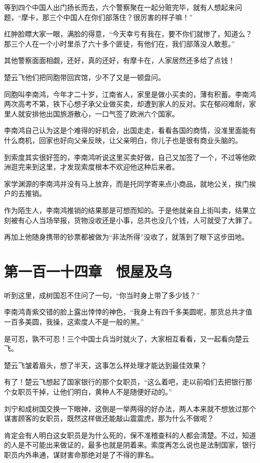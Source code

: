 等到四个中国人出门扬长而去，六个警察聚在一起分赃完毕，就有人想起来问题，“摩卡，那三个中国人在你们部落住？很厉害的样子嘛！”

红肿脸瞟大家一眼，满脸的得意，“今天幸亏有我在，要不你们就惨了，知道么？那三个人在一个小时里杀了六十多个匪徒，有他们在，我们部落没人敢惹。”

其他警察面面相觑，还好，真的还好，有摩卡在，人家居然还多给了点钱！

楚云飞他们把同胞带回宾馆，少不了又是一顿盘问。

同胞叫李南鸿，今年才二十岁，江南省人，家里是做小买卖的，薄有积蓄。李南鸿两次高考不第，铁下心想子承父业做买卖，却遭到家人的反对。实在郁闷难耐，家里人就安排他出国旅游散心，一口气签了欧洲六个国家。

李南鸿自己认为这是个难得的好机会，出国走走，看看各国的商情，没准里面能有什么商机，回家也好向父亲反映，让父亲明白，你儿子也是很有商业头脑的。

到索度其实很好签的，李南鸿听说这里买卖好做，自己又加签了一个，不过等他欧洲逛完来到这里，才发现索度根本不欢迎他这种后来者。

家学渊源的李南鸿并没有马上放弃，而是托同学寄来点小商品，就地公关，挨门挨户的去推销。

作为陌生人，李南鸿推销的结果那是可想而知的。于是他就亲自上街叫卖，结果立刻被有心人当场举报，货物没收还是小事，总共也没几个钱，人可就受了大罪了。

再加上他随身携带的钞票都被做为“非法所得”没收了，就落到了眼下这步田地。

\section{第一百一十四章　恨屋及乌}

听到这里，成树国忍不住问了一句，“你当时身上带了多少钱？”

李南鸿青紫交错的脸上露出悻悻的神色，“我身上有四千多美圆呢，那货总共才值一百多美圆，我操，这索度人不是一般的黑。”

是可忍，孰不可忍！三个中国士兵当时就火了，大家相互看看，又一起看向楚云飞。

楚云飞皱着眉头，想了半天，这事怎么样处理才能达到最佳效果？

有了！楚云飞想起了国家银行的那个女职员，“这么着吧，走以前咱们去把银行那个女职员干掉，让他们明白，黄种人不是随便好动的。”

刘宁和成树国交换一下眼神，这倒是一举两得的好办法，两人本来就不想放过那个谋害顾客的女职员，既然这样做还能敲山震震虎，那为什么不做呢？

肯定会有人明白这女职员是为什么死的，保不准稽查科的人都会清楚。不过，知道的人是不可能出来做证的，最多也就是阴着来。索度再怎么说也是法制国家，银行职员内外串通，谋财害命那绝对是了不得的罪名。

